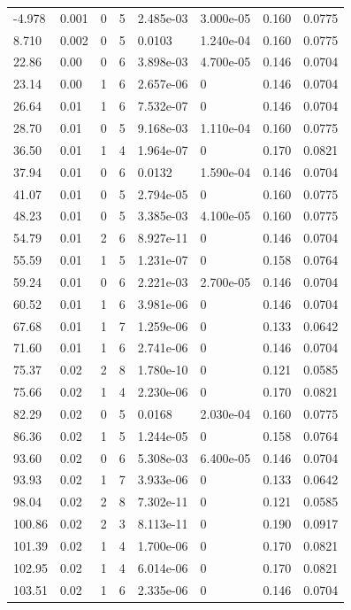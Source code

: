 \documentclass[preview]{standalone}
\begin{document}
{{\begin{tabular}{L{1.2cm}C{1.2cm} C{0.3cm}C{0.5cm} C{1.4cm}C{1.4cm} C{1.4cm}C{1.4cm}}
  -4.978  &  0.001  & 0     &  5 &  2.485e-03  & 3.000e-05  & 0.160 &  0.0775   \\ 
  8.710  &  0.002  & 0     &  5 &  0.0103  & 1.240e-04  & 0.160 &  0.0775   \\ 
  22.86  &  0.00  & 0     &  6 &  3.898e-03  & 4.700e-05  & 0.146 &  0.0704   \\ 
  23.14  &  0.00  & 1     &  6 &  2.657e-06  & 0  & 0.146 &  0.0704   \\ 
  26.64  &  0.01  & 1     &  6 &  7.532e-07  & 0  & 0.146 &  0.0704   \\ 
  28.70  &  0.01  & 0     &  5 &  9.168e-03  & 1.110e-04  & 0.160 &  0.0775   \\ 
  36.50  &  0.01  & 1     &  4 &  1.964e-07  & 0  & 0.170 &  0.0821   \\ 
  37.94  &  0.01  & 0     &  6 &  0.0132  & 1.590e-04  & 0.146 &  0.0704   \\ 
  41.07  &  0.01  & 0     &  5 &  2.794e-05  & 0  & 0.160 &  0.0775   \\ 
  48.23  &  0.01  & 0     &  5 &  3.385e-03  & 4.100e-05  & 0.160 &  0.0775   \\ 
  54.79  &  0.01  & 2     &  6 &  8.927e-11  & 0  & 0.146 &  0.0704   \\ 
  55.59  &  0.01  & 1     &  5 &  1.231e-07  & 0  & 0.158 &  0.0764   \\ 
  59.24  &  0.01  & 0     &  6 &  2.221e-03  & 2.700e-05  & 0.146 &  0.0704   \\ 
  60.52  &  0.01  & 1     &  6 &  3.981e-06  & 0  & 0.146 &  0.0704   \\ 
  67.68  &  0.01  & 1     &  7 &  1.259e-06  & 0  & 0.133 &  0.0642   \\ 
  71.60  &  0.01  & 1     &  6 &  2.741e-06  & 0  & 0.146 &  0.0704   \\ 
  75.37  &  0.02  & 2     &  8 &  1.780e-10  & 0  & 0.121 &  0.0585   \\ 
  75.66  &  0.02  & 1     &  4 &  2.230e-06  & 0  & 0.170 &  0.0821   \\ 
  82.29  &  0.02  & 0     &  5 &  0.0168  & 2.030e-04  & 0.160 &  0.0775   \\ 
  86.36  &  0.02  & 1     &  5 &  1.244e-05  & 0  & 0.158 &  0.0764   \\ 
  93.60  &  0.02  & 0     &  6 &  5.308e-03  & 6.400e-05  & 0.146 &  0.0704   \\ 
  93.93  &  0.02  & 1     &  7 &  3.933e-06  & 0  & 0.133 &  0.0642   \\ 
  98.04  &  0.02  & 2     &  8 &  7.302e-11  & 0  & 0.121 &  0.0585   \\ 
  100.86  &  0.02  & 2     &  3 &  8.113e-11  & 0  & 0.190 &  0.0917   \\ 
  101.39  &  0.02  & 1     &  4 &  1.700e-06  & 0  & 0.170 &  0.0821   \\ 
  102.95  &  0.02  & 1     &  4 &  6.014e-06  & 0  & 0.170 &  0.0821   \\ 
  103.51  &  0.02  & 1     &  6 &  2.335e-06  & 0  & 0.146 &  0.0704   \\ 
\hline 
\end{tabular} 

}}
\end{document}

